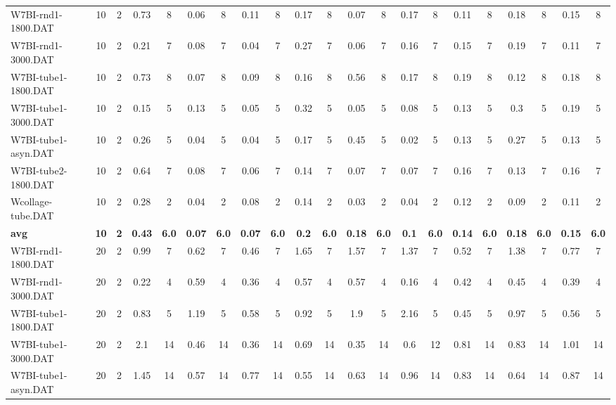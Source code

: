 \begin{sidewaystable}[!ht]
{\begin{tabular}{lcccccccccccccccccccc}
W7BI-rnd1-1800.DAT & 10 & 2 & 0.73 & 8 &  \textcolor{blue2}{0.06} & 8 & 0.11 & 8 & 0.17 & 8 & 0.07 & 8 & 0.17 & 8 & 0.11 & 8 & 0.18 & 8 & 0.15 & 8 \\
W7BI-rnd1-3000.DAT & 10 & 2 & 0.21 & 7 & 0.08 & 7 &  \textcolor{blue2}{0.04} & 7 & 0.27 & 7 & 0.06 & 7 & 0.16 & 7 & 0.15 & 7 & 0.19 & 7 & 0.11 & 7 \\
W7BI-tube1-1800.DAT & 10 & 2 & 0.73 & 8 &  \textcolor{blue2}{0.07} & 8 & 0.09 & 8 & 0.16 & 8 & 0.56 & 8 & 0.17 & 8 & 0.19 & 8 & 0.12 & 8 & 0.18 & 8 \\
W7BI-tube1-3000.DAT & 10 & 2 & 0.15 & 5 & 0.13 & 5 &  \textcolor{blue2}{0.05} & 5 & 0.32 & 5 &  \textcolor{blue2}{0.05} & 5 & 0.08 & 5 & 0.13 & 5 & 0.3 & 5 & 0.19 & 5 \\
W7BI-tube1-asyn.DAT & 10 & 2 & 0.26 & 5 & 0.04 & 5 & 0.04 & 5 & 0.17 & 5 & 0.45 & 5 &  \textcolor{blue2}{0.02} & 5 & 0.13 & 5 & 0.27 & 5 & 0.13 & 5 \\
W7BI-tube2-1800.DAT & 10 & 2 & 0.64 & 7 & 0.08 & 7 &  \textcolor{blue2}{0.06} & 7 & 0.14 & 7 & 0.07 & 7 & 0.07 & 7 & 0.16 & 7 & 0.13 & 7 & 0.16 & 7 \\
Wcollage-tube.DAT & 10 & 2 & 0.28 & 2 & 0.04 & 2 & 0.08 & 2 & 0.14 & 2 &  \textcolor{blue2}{0.03} & 2 & 0.04 & 2 & 0.12 & 2 & 0.09 & 2 & 0.11 & 2 \\
\cline{1-21} \textbf{avg} & \textbf{10} & \textbf{2} & \textbf{0.43} & \textbf{6.0} & \textbf{0.07} & \textbf{6.0} & \textbf{0.07} & \textbf{6.0} & \textbf{0.2} & \textbf{6.0} & \textbf{0.18} & \textbf{6.0} & \textbf{0.1} & \textbf{6.0} & \textbf{0.14} & \textbf{6.0} & \textbf{0.18} & \textbf{6.0} & \textbf{0.15} & \textbf{6.0} \\ \cline{1-21}
W7BI-rnd1-1800.DAT & 20 & 2 & 0.99 & 7 & 0.62 & 7 &  \textcolor{blue2}{0.46} & 7 & 1.65 & 7 & 1.57 & 7 & 1.37 & 7 & 0.52 & 7 & 1.38 & 7 & 0.77 & 7 \\
W7BI-rnd1-3000.DAT & 20 & 2 & 0.22 & 4 & 0.59 & 4 & 0.36 & 4 & 0.57 & 4 & 0.57 & 4 &  \textcolor{blue2}{0.16} & 4 & 0.42 & 4 & 0.45 & 4 & 0.39 & 4 \\
W7BI-tube1-1800.DAT & 20 & 2 & 0.83 & 5 & 1.19 & 5 & 0.58 & 5 & 0.92 & 5 & 1.9 & 5 & 2.16 & 5 &  \textcolor{blue2}{0.45} & 5 & 0.97 & 5 & 0.56 & 5 \\
W7BI-tube1-3000.DAT & 20 & 2 & 2.1 & 14 & 0.46 & 14 & 0.36 & 14 & 0.69 & 14 &  \textcolor{blue2}{0.35} & 14 & 0.6 & 12 & 0.81 & 14 & 0.83 & 14 & 1.01 & 14 \\
W7BI-tube1-asyn.DAT & 20 & 2 & 1.45 & 14 & 0.57 & 14 & 0.77 & 14 &  \textcolor{blue2}{0.55} & 14 & 0.63 & 14 & 0.96 & 14 & 0.83 & 14 & 0.64 & 14 & 0.87 & 14 \\

\end{tabular}}
\end{sidewaystable}
